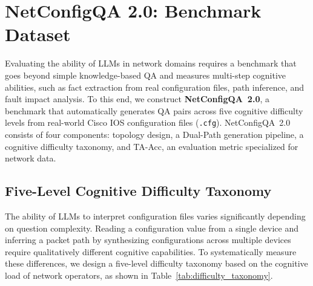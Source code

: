 
\section{NetConfigQA 2.0: Benchmark Dataset}

Evaluating the ability of LLMs in network domains requires a benchmark that goes beyond simple knowledge-based QA and measures multi-step cognitive abilities, such as fact extraction from real configuration files, path inference, and fault impact analysis.
To this end, we construct \textbf{NetConfigQA~2.0}, a benchmark that automatically generates QA pairs across five cognitive difficulty levels from real-world Cisco IOS configuration files (\texttt{.cfg}).
NetConfigQA~2.0 consists of four components: topology design, a Dual-Path generation pipeline, a cognitive difficulty taxonomy, and TA-Acc, an evaluation metric specialized for network data.



\subsection{Five-Level Cognitive Difficulty Taxonomy}


The ability of LLMs to interpret configuration files varies significantly depending on question complexity.
Reading a configuration value from a single device and inferring a packet path by synthesizing configurations across multiple devices require qualitatively different cognitive capabilities.
To systematically measure these differences, we design a five-level difficulty taxonomy based on the cognitive load of network operators, as shown in Table~\ref{tab:difficulty_taxonomy}.

